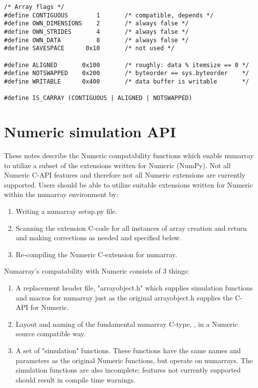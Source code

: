 \begin{verbatim}
/* Array flags */
#define CONTIGUOUS        1       /* compatible, depends */
#define OWN_DIMENSIONS    2       /* always false */
#define OWN_STRIDES       4       /* always false */
#define OWN_DATA          8       /* always false */
#define SAVESPACE      0x10       /* not used */

#define ALIGNED       0x100       /* roughly: data % itemsize == 0 */
#define NOTSWAPPED    0x200       /* byteorder == sys.byteorder    */
#define WRITABLE      0x400       /* data buffer is writable       */

#define IS_CARRAY (CONTIGUOUS | ALIGNED | NOTSWAPPED)
\end{verbatim}

\section{Numeric simulation API}
\label{sec:C-API:numeric-simulation}

These notes describe the Numeric compatability functions which enable numarray
to utilize a subset of the extensions written for Numeric (NumPy).  Not all
Numeric C-API features and therefore not all Numeric extensions are currently
supported.  Users should be able to utilize suitable extensions written for
Numeric within the numarray environment by:

\begin{enumerate}
\item Writing a numarray setup.py file.
\item Scanning the extension C-code for all instances of array creation and
  return and making corrections as needed and specified below. 
\item Re-compiling the Numeric C-extension for numarray.
\end{enumerate}

Numarray's compatability with Numeric consists of 3 things:
\begin{enumerate}
\item A replacement header file, "arrayobject.h" which supplies simulation
   functions and macros for numarray just as the original arrayobject.h
   supplies the C-API for Numeric.
\item Layout and naming of the fundamental numarray C-type,
, in a Numeric source compatible way.
\item A set of "simulation" functions.  These functions have the same names and
   parameters as the original Numeric functions, but operate on numarrays.  The
   simulation functions are also incomplete; features not currently supported
   should result in compile time warnings.
\end{enumerate}

